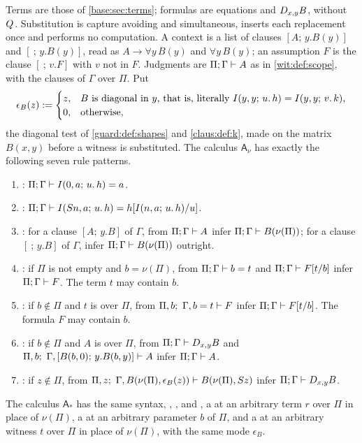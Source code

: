 \begin{definition}
\label{wit:def:ab}
Terms are those of \cref{base:sec:terms}; formulas are equations and
$D_{x,y}B$, without $Q_{}$.  Substitution is capture avoiding and
simultaneous, inserts each replacement once and performs no computation.
A context is a list of clauses $[A;\,y.B(y)]$ and $[\ ;\,y.B(y)]$, read as
$A\to\forall y\,B(y)$ and $\forall y\,B(y)$; an assumption $F$ is the clause
$[\ ;\,v.F]$ with $v$ not in $F$.  Judgments are $\Pi;\Gamma\vdash A$ as in
\cref{wit:def:scope}, with the clauses of $\Gamma$ over $\Pi$.  Put
\[
 \epsilon_B(z)\mathrel{:=}
 \begin{cases}
  z,&\text{$B$ is diagonal in $y$, that is, literally
        $I(y,y;\,u.\,h)=I(y,y;\,v.\,k)$,}\\
  0,&\text{otherwise,}
 \end{cases}
\]
the diagonal test of \cref{guard:def:shapes} and \cref{claus:def:k}, made on
the matrix $B(x,y)$ before a witness is substituted.  The calculus
$\mathsf{A}_{\nu}$ has exactly the following seven rule patterns.
\begin{enumerate}[label=\textup{(\roman*)}]
\item {}: $\Pi;\Gamma\vdash I(0,a;\,u.\,h)=a$.
\item {}: $\Pi;\Gamma\vdash I(S n,a;\,u.\,h)
 =h[I(n,a;\,u.\,h)/u]$.
\item {}: for a clause $[A;\,y.B]$ of $\Gamma$, from
 $\Pi;\Gamma\vdash A$ infer $\Pi;\Gamma\vdash B(\nu(\Pi))$; for a clause
 $[\ ;\,y.B]$ of $\Gamma$, infer $\Pi;\Gamma\vdash B(\nu(\Pi))$ outright.
\item {}: if $\Pi$ is not empty and $b=\nu(\Pi)$, from
 $\Pi;\Gamma\vdash b=t$ and $\Pi;\Gamma\vdash F[t/b]$ infer
 $\Pi;\Gamma\vdash F$.  The term $t$ may contain $b$.
\item {}: if $b\notin\Pi$ and $t$ is over $\Pi$, from
 $\Pi,b;\ \Gamma,b=t\vdash F$ infer $\Pi;\Gamma\vdash F[t/b]$.  The
 formula $F$ may contain $b$.
\item {}: if $b\notin\Pi$ and $A$ is over $\Pi$, from
 $\Pi;\Gamma\vdash D_{x,y}B$ and
 $\Pi,b;\ \Gamma,[B(b,0);\,y.B(b,y)]\vdash A$ infer $\Pi;\Gamma\vdash A$.
\item {}: if $z\notin\Pi$, from
 $\Pi,z;\ \Gamma,B(\nu(\Pi),\epsilon_B(z))\proves B(\nu(\Pi),\Suc z)$ infer
 $\Pi;\Gamma\vdash D_{x,y}B$.
\end{enumerate}
The calculus $\mathsf{A}_{\ast}$ has the same syntax, ,
,  and , a  at an
arbitrary term $r$ over $\Pi$ in place of $\nu(\Pi)$, a  at
an arbitrary parameter $b$ of $\Pi$, and a  at an arbitrary
witness $t$ over $\Pi$ in place of $\nu(\Pi)$, with the same mode
$\epsilon_B$.
\end{definition}

